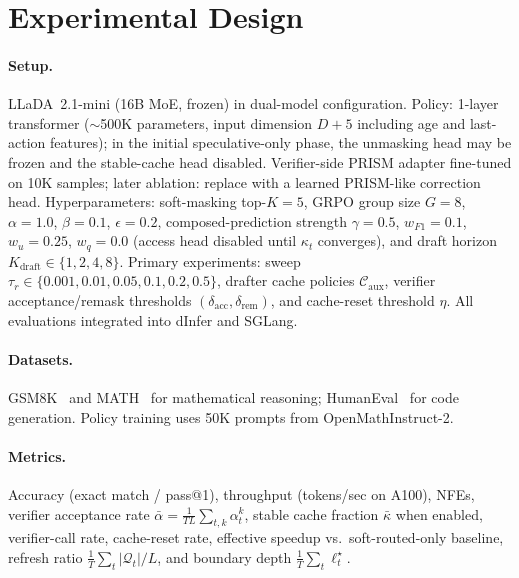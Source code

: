 \documentclass[11pt]{article}
\newcommand{\cQ}{\mathcal{Q}}
\newcommand{\cC}{\mathcal{C}}
\begin{document}
\section{Experimental Design}
\label{sec:experiments}

\paragraph{Setup.}
LLaDA~2.1-mini (16B MoE, frozen) in dual-model configuration.
Policy: 1-layer transformer (${\sim}$500K parameters, input dimension $D{+}5$ including age and last-action features); in the initial speculative-only phase, the unmasking head may be frozen and the stable-cache head disabled.
Verifier-side PRISM adapter fine-tuned on 10K samples; later ablation: replace with a learned PRISM-like correction head.
Hyperparameters: soft-masking top-$K{=}5$, GRPO group size $G{=}8$, $\alpha{=}1.0$, $\beta{=}0.1$, $\epsilon{=}0.2$, composed-prediction strength $\gamma{=}0.5$, $w_{F1}{=}0.1$, $w_u{=}0.25$, $w_q{=}0.0$ (access head disabled until $\kappa_t$ converges), and draft horizon $K_{\text{draft}} \in \{1,2,4,8\}$.
Primary experiments: sweep $\tau_r \in \{0.001, 0.01, 0.05, 0.1, 0.2, 0.5\}$, drafter cache policies $\cC_{\text{aux}}$, verifier acceptance/remask thresholds $(\delta_{\text{acc}}, \delta_{\text{rem}})$, and cache-reset threshold $\eta$.
All evaluations integrated into dInfer and SGLang.

\paragraph{Datasets.}
GSM8K~\cite{cobbe2021gsm8k} and MATH~\cite{hendrycks2021math} for mathematical reasoning; HumanEval~\cite{chen2021humaneval} for code generation.
Policy training uses 50K prompts from OpenMathInstruct-2.

\paragraph{Metrics.}
Accuracy (exact match / pass@1), throughput (tokens/sec on A100), NFEs, verifier acceptance rate $\bar{\alpha} = \frac{1}{TL}\sum_{t,k} \alpha_t^k$, stable cache fraction $\bar{\kappa}$ when enabled, verifier-call rate, cache-reset rate, effective speedup vs.\ soft-routed-only baseline, refresh ratio $\frac{1}{T}\sum_t |\cQ_t|/L$, and boundary depth $\frac{1}{T}\sum_t \ell_t^\star$.
\end{document}
